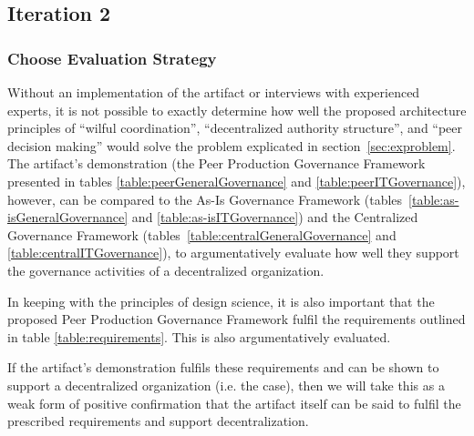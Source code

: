 

\subsection{Iteration 2}
\subsubsection*{Choose Evaluation Strategy}

Without an implementation of the artifact or interviews with experienced experts, it is not possible to exactly determine how well the proposed architecture principles of ``wilful coordination'', ``decentralized authority structure'', and ``peer decision making'' would solve the problem explicated in section~\ref{sec:exproblem}. The artifact's demonstration (the Peer Production Governance Framework presented in tables \ref{table:peerGeneralGovernance} and \ref{table:peerITGovernance}), however, can be compared to the As-Is Governance Framework (tables~\ref{table:as-isGeneralGovernance} and \ref{table:as-isITGovernance}) and the Centralized Governance Framework (tables~\ref{table:centralGeneralGovernance}  and \ref{table:centralITGovernance}), to argumentatively evaluate how well they support the governance activities of a decentralized organization. 

In keeping with the principles of design science, it is also important that the proposed Peer Production Governance Framework fulfil the requirements outlined in table \ref{table:requirements}. This is also argumentatively evaluated. 

If the artifact's demonstration fulfils these requirements and can be shown to support a decentralized organization (i.e. the case), then we will take this as a weak form of positive confirmation  that the artifact itself can be said to fulfil the prescribed requirements and support decentralization.


